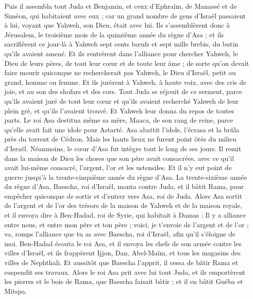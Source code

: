 \begin{multicols}{2}
Puis il assembla tout Juda et Benjamin, et ceux d'Ephraïm, de Manassé et de Siméon, qui habitaient avec eux ; car un grand nombre de gens d'Israël passaient à lui, voyant que Yahweh, son Dieu, était avec lui.
Ils s'assemblèrent donc à Jérusalem, le troisième mois de la quinzième année du règne d'Asa ;
et ils sacrifièrent ce jour-là à Yahweh sept cents bœufs et sept mille brebis, du butin qu'ils avaient amené.
Et ils rentrèrent dans l'alliance pour chercher Yahweh, le Dieu de leurs pères, de tout leur cœur et de toute leur âme ;
de sorte qu'on devait faire mourir quiconque ne rechercherait pas Yahweh, le Dieu d'Israël, petit ou grand, homme ou femme.
Et ils jurèrent à Yahweh, à haute voix, avec des cris de joie, et au son des shofars et des cors.
Tout Juda se réjouit de ce serment, parce qu'ils avaient juré de tout leur cœur et qu'ils avaient recherché Yahweh de leur plein gré, et qu'ils l'avaient trouvé. Et Yahweh leur donna du repos de toutes parts.
Le roi Asa destitua même sa mère, Maaca, de son rang de reine, parce qu'elle avait fait une idole pour Astarté. Asa abattit l'idole, l'écrasa et la brûla près du torrent de Cédron.
Mais les hauts lieux ne furent point ôtés du milieu d'Israël. Néanmoins, le cœur d'Asa fut intègre tout le long de ses jours.
Il remit dans la maison de Dieu les choses que son père avait consacrées, avec ce qu'il avait lui-même consacré, l'argent, l'or et les ustensiles.
Et il n'y eut point de guerre jusqu'à la trente-cinquième année du règne d'Asa.
\VerseOne{}La trente-sixième année du règne d'Asa, Baescha, roi d'Israël, monta contre Juda, et il bâtit Rama, pour empêcher quiconque de sortir et d'entrer vers Asa, roi de Juda.
Alors Asa sortit de l'argent et de l'or des trésors de la maison de Yahweh et de la maison royale, et il envoya dire à Ben-Hadad, roi de Syrie, qui habitait à Damas :
Il y a alliance entre nous, et entre mon père et ton père ; voici, je t'envoie de l'argent et de l'or ; va, romps l'alliance que tu as avec Baescha, roi d'Israël, afin qu'il s'éloigne de moi.
Ben-Hadad écouta le roi Asa, et il envoya les chefs de son armée contre les villes d'Israël, et ils frappèrent Ijjon, Dan, Abel-Maïm, et tous les magasins des villes de Nephthali.
Et aussitôt que Baescha l'apprit, il cessa de bâtir Rama et suspendit ses travaux.
Alors le roi Asa prit avec lui tout Juda, et ils emportèrent les pierres et le bois de Rama, que Baescha faisait bâtir ; et il en bâtit Guéba et Mitspa.

\end{multicols}
